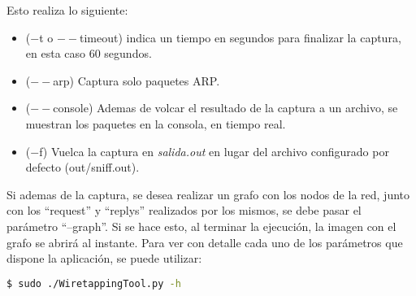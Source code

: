Esto realiza lo siguiente:

\begin{itemize}
	\item ($-$t o $--$timeout) indica un tiempo en segundos para finalizar la captura, en esta caso 60 segundos.
	\item ($--$arp) Captura solo paquetes ARP.
	\item ($--$console) Ademas de volcar el resultado de la captura a un archivo, se muestran los paquetes en la consola, en tiempo real.
	\item ($-$f) Vuelca la captura en \textit{salida.out} en lugar del archivo configurado por defecto (out/sniff.out).
\end{itemize}

Si ademas de la captura, se desea realizar un grafo con los nodos de la red, junto con los ``request'' y ``replys'' realizados por los mismos, se debe pasar el parámetro ``--graph''. Si se hace esto, al terminar la ejecución, la imagen con el grafo se abrirá al instante. Para ver con detalle cada uno de los parámetros que dispone la aplicación, se puede utilizar:

\begin{lstlisting}[language=bash]
  $ sudo ./WiretappingTool.py -h
\end{lstlisting}